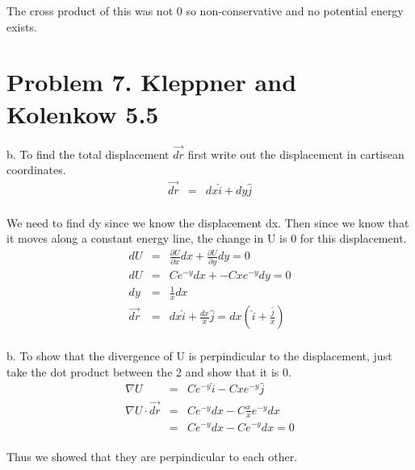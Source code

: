 \documentclass[11pt]{amsart}
\begin{document}
The cross product of this was not 0 so non-conservative and no potential energy exists. \\ 

\section{Problem 7. Kleppner and Kolenkow 5.5}
b. To find the total displacement $\vec{dr}$ first write out the displacement in cartisean coordinates. \\
\begin{eqnarray*} 
\vec{dr} &=& dx\hat{i}+dy\hat{j} 
\end{eqnarray*} \\
We need to find dy since we know the displacement dx. Then since we know that it moves along a constant energy line, the change in U is 0 for this displacement.\\
\begin{eqnarray*}
dU &=& \frac{\partial{U}}{\partial{x}}dx+\frac{\partial{U}}{\partial{y}}dy = 0 \\
dU &=& Ce^{-y}dx+-Cxe^{-y}dy = 0 \\
dy &=& \frac{1}{x}dx \\
\vec{dr} &=& dx\hat{i}+\frac{dx}{x}\hat{j} = dx(\hat{i}+\frac{\hat{j}}{x}) 
\end{eqnarray*} \\ 
b. To show that the divergence of U is perpindicular to the displacement, just take the dot product between the 2 and show that it is 0. \\
\begin{eqnarray*}
\nabla{U} &=& Ce^{-y}\hat{i}-Cxe^{-y}\hat{j} \\
\nabla{U}\cdot{\vec{dr}} &=& Ce^{-y}dx-C\frac{x}{x}e^{-y}dx \\
&=& Ce^{-y}dx-Ce^{-y}dx = 0 
\end{eqnarray*} \\
Thus we showed that they are perpindicular to each other. \\
\end{document}
